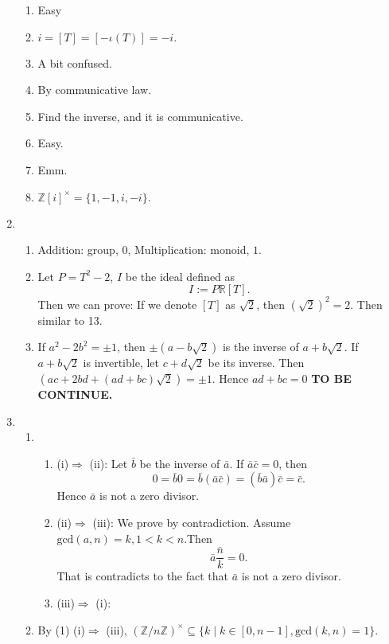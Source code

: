 \documentclass[12pt]{article}
\newcommand{\ZZ}{\mathbb{Z}}
\newcommand{\RR}{\mathbb{R}}
\begin{document}
\begin{enumerate}
\begin{enumerate}
            \item Easy
            \item $i=[T]=[-\iota(T)]=-i.$
            \item A bit confused.
            \item By communicative law.
            \item Find the inverse, and it is communicative.
            \item Easy.
            \item Emm.
            \item $\ZZ[i]^\times=\{1,-1,i,-i\}.$
        \end{enumerate}
    \item
        \begin{enumerate}
            \item Addition: group, $0$, Multiplication: monoid, $1$.
            \item Let $P=T^2-2$, $I$ be the ideal defined as 
                $$I:=P\RR[T].$$
                Then we can prove: If we denote $[T]$ as $\sqrt{2}$, then $\left(\sqrt{2}\right)^2=2.$ Then similar to 13.
            \item If $a^2-2b^2=\pm 1$, then $\pm(a-b\sqrt{2})$ is the inverse of $a+b\sqrt{2}.$ If $a+b\sqrt{2}$ is invertible, let $c+d\sqrt{2}$ be its inverse. Then $\left(ac+2bd+(ad+bc)\sqrt{2}\right)=\pm 1.$ Hence $ad+bc=0$ \textbf{TO BE CONTINUE.}
        \end{enumerate}
        \setcounter{enumi}{14}
    \item 
        \begin{enumerate}
            \item 
                \begin{enumerate}
                    \item (i)$\Rightarrow$ (ii): Let $\bar{b}$ be the inverse of $\bar{a}$. If $\bar{a}\bar{c}=0$, then
                        $$0=\bar{b}0=\bar{b}(\bar{a}\bar{c})=(\bar{b}\bar{a})\bar{c}=\bar{c}.$$
                        Hence $\bar{a}$ is not a zero divisor.
                    \item (ii)$\Rightarrow$ (iii): We prove by contradiction. Assume $\mathrm{gcd}(a,n)=k,1<k<n$.Then
                        $$\bar{a}\bar{\frac{n}{k}}=0.$$
                        That is contradicts to the fact that $\bar{a}$ is not a zero divisor.
                    \item (iii)$\Rightarrow$ (i): 
                \end{enumerate}
                \item By (1) (i)$\Rightarrow$ (iii), $(\ZZ/n\ZZ)^\times\subseteq\{k\mid k\in [0,n-1], \mathrm{gcd}(k,n)=1\}$.

\end{enumerate}
\end{enumerate}
\end{document}

